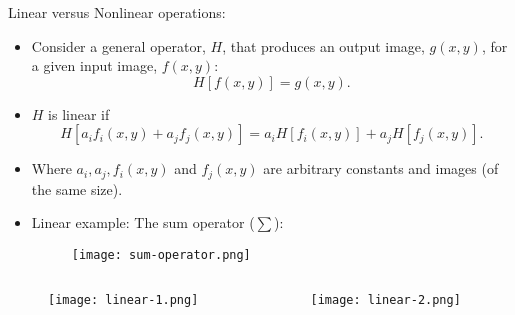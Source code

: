 
\begin{frame}
Linear versus Nonlinear operations:
\begin{itemize}
\item Consider a general operator, $H$, that produces an output image, $g(x, y)$, for a given input image, $f(x, y)$:
\begin{equation}
H[f(x,y)]=g(x,y).
\end{equation}
\item $H$ is linear if
\begin{equation}
H[a_{i}f_{i}(x,y) + a_{j}f_{j}(x,y)] = a_{i}H[f_{i}(x,y)] + a_{j} H[f_{j}(x,y)].
\end{equation}
\item Where $a_{i}, a_{j}, f_{i}(x,y)$ and $f_{j}(x,y)$ are arbitrary constants and images (of the same size).
\end{itemize}
\end{frame}


\begin{frame}
\begin{itemize}
\item Linear example: The sum operator ($\sum$):
\begin{figure}
\centering
\texttt{[image: sum-operator.png]}
\end{figure}
\end{itemize}
\end{frame}


\begin{frame}
\begin{columns}
\begin{column}{.5\textwidth}
\begin{figure}
\centering
\texttt{[image: linear-1.png]}
\end{figure}
\end{column}
\begin{column}{.5\textwidth}
\begin{figure}
\centering
\texttt{[image: linear-2.png]}
\end{figure}
\end{column}
\end{columns}
\end{frame}

